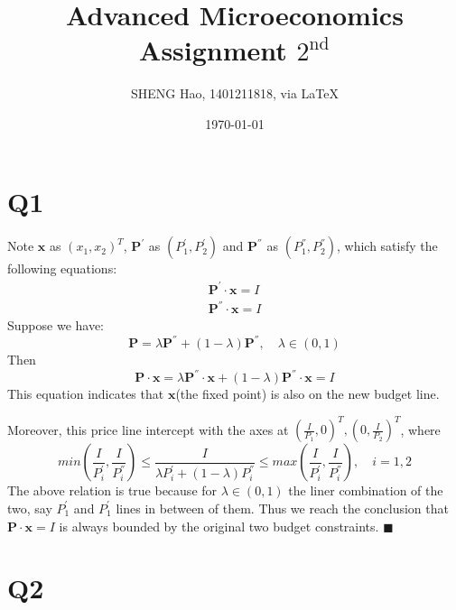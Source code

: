 \documentclass{article}
\begin{document}
\title{Advanced Microeconomics\\Assignment $2^{\text{nd}}$}
\author{{\normalsize SHENG Hao, 1401211818, via \LaTeX}}
\date{\today}

\maketitle

\def \Pr{{\rm Pr}}
\baselineskip 0.6cm
\section{Q1\protect\footnotemark}
Note $\bm{x}$ as $(x_1,x_2)^T$, $\bm{P^{'}}$ as $(P^{'}_1, P^{'}_2)$ and $\bm{P^{''}}$ as $(P^{''}_1, P^{''}_2)$, which satisfy the following equations:
\begin{align}
	\bm{P^{'}} \cdot \bm{x} = I\\
	\bm{P^{''}} \cdot \bm{x} = I
\end{align}
Suppose we have:
\begin{equation}
	\bm{P} = \lambda \bm{P^{''}} +(1-\lambda)\bm{P^{''}},\quad\lambda \in (0, 1)
\end{equation}
Then
\begin{equation}
\bm{P} \cdot \bm{x} = \lambda \bm{P^{''}} \cdot \bm{x} + (1-\lambda) \bm{P^{''}} \cdot\bm{x} = I
\end{equation}
This equation indicates that $\bm{x}$(the fixed point) is also on the new budget line.

Moreover, this price line intercept with the axes at $(\frac{I}{P_1},0)^T, (0, \frac{I}{P_2})^T$, where
\begin{equation}
	min(\frac{I}{P^{'}_i},\frac{I}{P^{''}_i})\leq \frac{I}{\lambda P^{'}_i +(1-\lambda)P^{''}_i} \leq max(\frac{I}{P^{'}_i},\frac{I}{P^{''}_i}),\quad i = 1,2
\end{equation}
The above relation is true because for $\lambda \in (0,1)$ the liner combination of the two, say $P^{'}_1$ and $P^{'}_1$ lines in between of them.
Thus we reach the conclusion that $\bm{P} \cdot \bm{x} = I$ is always bounded by the original two budget constraints. $\blacksquare$

\section{Q2\protect\footnotemark}
\end{document}
